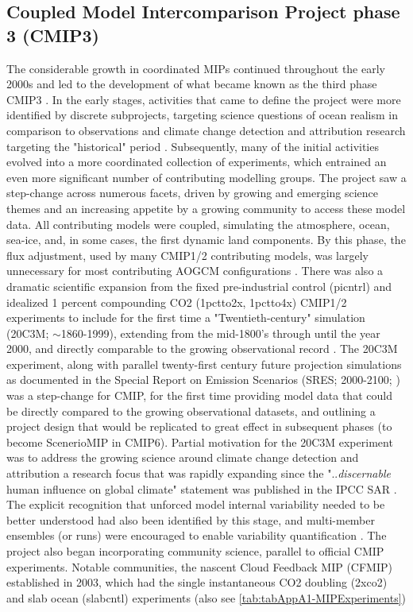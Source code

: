 \documentclass[gmd, preprint]{copernicus}
\begin{document}
\subsection{Coupled Model Intercomparison Project phase 3 (CMIP3)}
\label{sec:cmip3}
The considerable growth in coordinated MIPs continued throughout the early 2000s and led to the development of what became known as the third phase CMIP3 \citep{meehl_wcrp_2007}. In the early stages, activities that came to define the project were more identified by discrete subprojects, targeting science questions of ocean realism in comparison to observations \citep{orr_ocean_1999, dutay_evaluation_2002, dutay_evaluation_2004} and climate change detection and attribution research targeting the "historical" period \citep{hegerl_20c3m_2003}. Subsequently, many of the initial activities evolved into a more coordinated collection of experiments, which entrained an even more significant number of contributing modelling groups. The project saw a step-change across numerous facets, driven by growing and emerging science themes and an increasing appetite by a growing community to access these model data. All contributing models were coupled, simulating the atmosphere, ocean, sea-ice, and, in some cases, the first dynamic land components. By this phase, the flux adjustment, used by many CMIP1/2 contributing models, was largely unnecessary for most contributing AOGCM configurations \citep{durack_ocean_2012}. There was also a dramatic scientific expansion from the fixed pre-industrial control (picntrl) and idealized 1 percent compounding CO2 (1pctto2x, 1pctto4x) CMIP1/2 experiments to include for the first time a "Twentieth-century" simulation (20C3M; $\sim$1860-1999), extending from the mid-1800's through until the year 2000, and directly comparable to the growing observational record \citep{meehl_wcrp_2007}. The 20C3M experiment, along with parallel twenty-first century future projection simulations as documented in the Special Report on Emission Scenarios (SRES; 2000-2100; \citet{nakicenovic_summary_2000}) was a step-change for CMIP, for the first time providing model data that could be directly compared to the growing observational datasets, and outlining a project design that would be replicated to great effect in subsequent phases (to become ScenerioMIP in CMIP6). Partial motivation for the 20C3M experiment was to address the growing science around climate change detection and attribution \citep{santer_detection_1996-1, hegerl_20c3m_2003} a research focus that was rapidly expanding since the "..\emph{discernable} human influence on global climate" statement was published in the IPCC SAR \citep{santer_detection_1996}. The explicit recognition that unforced model internal variability needed to be better understood had also been identified by this stage, and multi-member ensembles (or runs) were encouraged to enable variability quantification \citep{meehl_wcrp_2007}. The project also began incorporating community science, parallel to official CMIP experiments. Notable communities, the nascent Cloud Feedback MIP (CFMIP) established in 2003, which had the single instantaneous CO2 doubling (2xco2) and slab ocean (slabcntl) experiments (also see \autoref{tab:tabAppA1-MIPExperiments}) 
\end{document}
